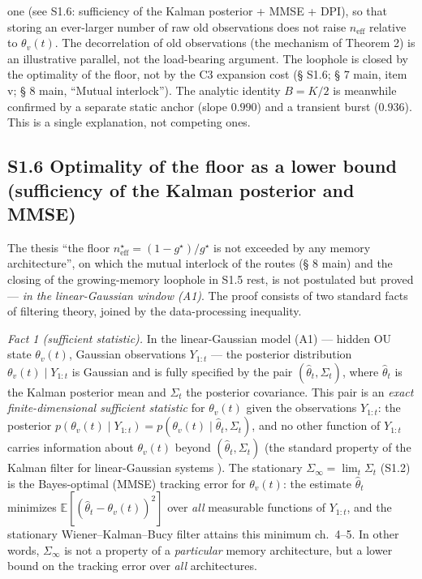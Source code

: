 \documentclass[12pt]{iopart}
\begin{document}
one (see S1.6: sufficiency of the Kalman posterior + MMSE + DPI), so that storing an ever-larger number of raw old observations does not raise \(n_{\text{eff}}\) relative to \(\theta_v(t)\). The decorrelation of old observations (the mechanism of Theorem 2) is an illustrative parallel, not the load-bearing argument. The loophole is closed by the optimality of the floor, not by the C3 expansion cost (§ S1.6; § 7 main, item v; § 8 main, ``Mutual interlock''). The analytic identity \(B = K/2\) is meanwhile confirmed by a separate static anchor (slope \(0.990\)) and a transient burst (\(0.936\)). This is a single explanation, not competing ones.



\subsection{S1.6 Optimality of the floor as a lower bound (sufficiency of the Kalman posterior and MMSE)}\label{s1.6-optimality-of-the-floor-as-a-lower-bound-sufficiency-of-the-kalman-posterior-and-mmse}



The thesis ``the floor \(n_{\text{eff}}^\star = (1-g^\star)/g^\star\) is not exceeded by any memory architecture'', on which the mutual interlock of the routes (§ 8 main) and the closing of the growing-memory loophole in S1.5 rest, is not postulated but proved --- \emph{in the linear-Gaussian window (A1)}. The proof consists of two standard facts of filtering theory, joined by the data-processing inequality.



\emph{Fact 1 (sufficient statistic).} In the linear-Gaussian model (A1) --- hidden OU state \(\theta_v(t)\), Gaussian observations \(Y_{1:t}\) --- the posterior distribution \(\theta_v(t)\mid Y_{1:t}\) is Gaussian and is fully specified by the pair \((\hat\theta_t,\Sigma_t)\), where \(\hat\theta_t\) is the Kalman posterior mean and \(\Sigma_t\) the posterior covariance. This pair is an \emph{exact finite-dimensional sufficient statistic} for \(\theta_v(t)\) given the observations \(Y_{1:t}\): the posterior \(p(\theta_v(t)\mid Y_{1:t}) = p(\theta_v(t)\mid \hat\theta_t,\Sigma_t)\), and no other function of \(Y_{1:t}\) carries information about \(\theta_v(t)\) beyond \((\hat\theta_t,\Sigma_t)\) (the standard property of the Kalman filter for linear-Gaussian systems \cite{AndersonMoore1979,KalmanBucy1961}). The stationary \(\Sigma_\infty = \lim_t\Sigma_t\) (S1.2) is the Bayes-optimal (MMSE) tracking error for \(\theta_v(t)\): the estimate \(\hat\theta_t\) minimizes \(\mathbb E[(\hat\theta_t-\theta_v(t))^2]\) over \emph{all} measurable functions of \(Y_{1:t}\), and the stationary Wiener--Kalman--Bucy filter attains this minimum \cite{AndersonMoore1979} ch.~4--5. In other words, \(\Sigma_\infty\) is not a property of a \emph{particular} memory architecture, but a lower bound on the tracking error over \emph{all} architectures.
\end{document}
